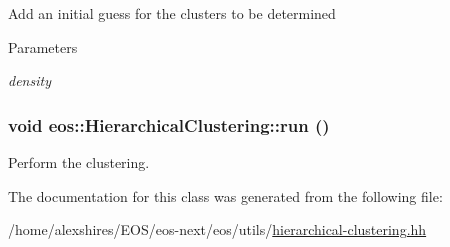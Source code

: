 \label{classeos_1_1HierarchicalClustering_af11950c9657fcfaf1962b3945e5feef6}
Add an initial guess for the clusters to be determined 
\begin{DoxyParams}{Parameters}
\item[{\em density}]\end{DoxyParams}
\hypertarget{classeos_1_1HierarchicalClustering_aff7df5f12bd5ddb276896cc43c597981}{
\subsubsection[{run}]{\setlength{\rightskip}{0pt plus 5cm}void eos::HierarchicalClustering::run ()}}
\label{classeos_1_1HierarchicalClustering_aff7df5f12bd5ddb276896cc43c597981}
Perform the clustering. 

The documentation for this class was generated from the following file:\begin{DoxyCompactItemize}
\item 
/home/alexshires/EOS/eos-\/next/eos/utils/\hyperlink{hierarchical-clustering_8hh}{hierarchical-\/clustering.hh}\end{DoxyCompactItemize}
